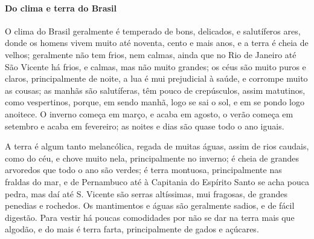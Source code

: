 \begin{linenumbers}

\paragraph{Do clima e terra do Brasil}\quad
O clima do Brasil geralmente é temperado de bons, delicados, e
salutíferos ares, donde os homens vivem muito até noventa, cento e
mais anos, e a terra é cheia de velhos; geralmente não tem frios, nem
calmas, ainda que no Rio de Janeiro até São Vicente há frios, e calmas,
mas não muito grandes; os céus são muito puros e claros,
principalmente de noite, a lua é mui prejudicial à saúde, e corrompe
muito as cousas; as manhãs são salutíferas, têm pouco de crepúsculos,
assim matutinos, como vespertinos, porque, em sendo manhã, logo se sai
o sol, e em se pondo logo anoitece. O inverno começa em março, e acaba
em agosto, o verão começa em setembro e acaba em fevereiro; as noites e
dias são quase todo o ano iguais. 

 A terra é algum tanto melancólica, regada de muitas águas, assim de
rios caudais, como do céu, e chove muito nela, principalmente no
inverno; é cheia de grandes arvoredos que todo o ano são verdes; é
terra montuosa, principalmente nas fraldas do mar, e de Pernambuco até
à Capitania do Espírito Santo se acha pouca pedra, mas daí até S.
Vicente são serras altíssimas, mui fragosas, de grandes penedias e
rochedos. Os mantimentos e águas são geralmente sadios, e de fácil
digestão. Para vestir há poucas comodidades por não se dar na terra
mais que algodão, e do mais é terra farta, principalmente de gados e
açúcares. 


\end{linenumbers}
